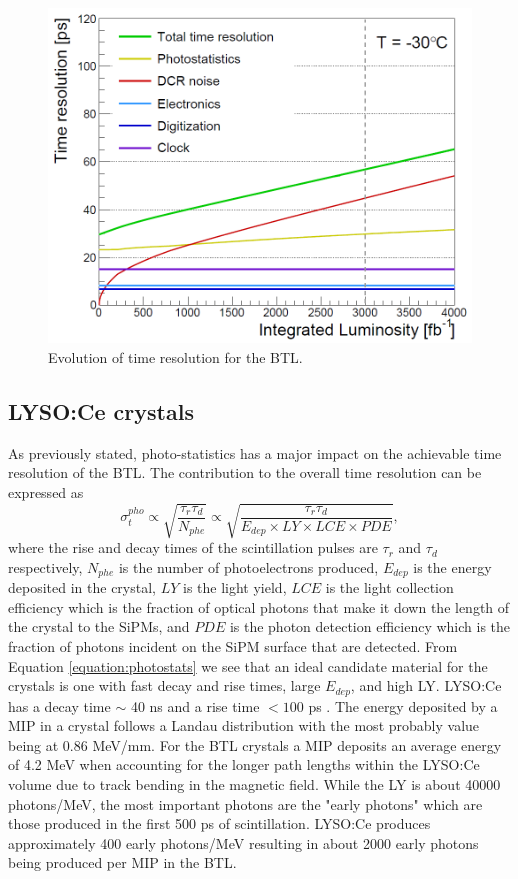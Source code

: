 \begin{figure}[h]
	\centering
	\includegraphics[width=1.0\linewidth]{Figures/btltimeres_evolution}
	\caption[Evolution of time resolution for the BTL.]{Evolution of time resolution for the BTL.}
	\label{fig:btltimeresevolution}
\end{figure}


\subsection{LYSO:Ce crystals}
As previously stated, photo-statistics has a major impact on the achievable time resolution of the BTL.  The contribution to the overall time resolution can be expressed as 
\begin{equation}
	\sigma_t^{pho} \propto \sqrt{\frac{\tau_r\tau_d}{N_{phe}}} \propto \sqrt{\frac{\tau_r\tau_d}{E_{dep}\times LY \times LCE \times PDE}},
	\label{equation:photostats}
\end{equation}
where the rise and decay times of the scintillation pulses are $\tau_r$ and $\tau_d$ respectively, $N_{phe}$ is the number of photoelectrons produced, $E_{dep}$ is the energy deposited in the crystal, $LY$ is the light yield, $LCE$ is the light collection efficiency which is the fraction of optical photons that make it down the length of the crystal to the SiPMs, and $PDE$ is the photon detection efficiency which is the fraction of photons incident on the SiPM surface that are detected.  From Equation \ref{equation:photostats} we see that an ideal candidate material for the crystals is one with fast decay and rise times, large $E_{dep}$, and high LY. LYSO:Ce has a decay time $\sim$ 40 ns and a rise time $<100$ ps \cite{Gundacker:2018tlh}.  The energy deposited by a MIP in a crystal follows a Landau distribution with the most probably value being at 0.86 MeV/mm.  For the BTL crystals a MIP deposits an average energy of 4.2 MeV when accounting for the longer path lengths within the LYSO:Ce volume due to track bending in the magnetic field.  While the LY is about 40000 photons/MeV, the most important photons are the "early photons" which are those produced in the first 500 ps of scintillation.  LYSO:Ce produces approximately 400 early photons/MeV resulting in about 2000 early photons being produced per MIP in the BTL. 

